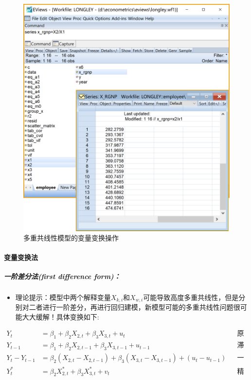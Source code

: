 \documentclass[12pt,(landscape,a4paper),(portrait,a4paper)]{article}
\providecommand{\tightlist}{%
  \setlength{\itemsep}{0pt}\setlength{\parskip}{0pt}}
\let\oldparagraph\paragraph
\renewcommand{\paragraph}[1]{\oldparagraph{#1}\mbox{}}
\let\oldsubparagraph\subparagraph
\renewcommand{\subparagraph}[1]{\oldsubparagraph{#1}\mbox{}}
\begin{document}
\begin{figure}

{\centering \includegraphics[width=8in]{picture/lab5-multilinearity/5-new-X} 

}

\caption{多重共线性模型的变量变换操作}\label{fig:fig-new-X}
\end{figure}

\paragraph{变量变换法}

\hypertarget{first-difference-form}{%
\subparagraph{一阶差分法(first difference
form)：}\label{first-difference-form}}

\begin{itemize}
\tightlist
\item
  理论提示：模型中两个解释变量\(X_{k,i}\)和\(X_{w,i}\)可能导致高度多重共线性，但是分别对二者进行一阶差分，再进行回归建模，新模型可能的多重共线性问题很可能大大缓解！具体变换如下:
\end{itemize}

\begin{align}
Y_t & =\beta_1+\beta_2X_{2,t}+\beta_3X_{3,t}+u_t && \text{原模型} \label{eq:diff0} \\
Y_{t-1} & =\beta_1+\beta_2X_{2,t-1}+\beta_3X_{3,t-1}+u_{t-1} && \text{滞后1阶变量模型} \label{eq:diff1} \\
Y_t-Y_{t-1} & =\beta_2(X_{2,t}-X_{2,t-1})+\beta_3(X_{3,t}-X_{3,t-1})+(u_t-u_{t-1}) && \text{一阶差分模型} \label{eq:diff} \\
Y^{\ast}_t &=\beta_2X^{\ast}_{2,t}+\beta_3X^{\ast}_{3,t}+v_t && \text{精简化模型} \label{eq:diff-new}
\end{align}
\end{document}
